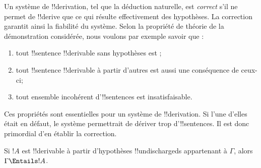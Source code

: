 \documentclass[../../../include/open-logic-section]{subfiles}
\begin{document}
      {}
      {}
      

\begin{explain}
Un système de !!{derivation}, tel que la déduction naturelle, est
\emph{correct} s'il ne permet de !!{derive} que ce qui résulte
effectivement des hypothèses. La correction garantit ainsi la
fiabilité du système. Selon la propriété de théorie de la
démonstration considérée, nous voulons par exemple savoir que :
\begin{enumerate}
\item tout !!{sentence} !!{derivable} sans hypothèses est
  ;
\item tout !!{sentence} !!{derivable} à partir d'autres est
  aussi une conséquence de ceux-ci;
\item tout ensemble incohérent d'!!{sentence}s est insatisfaisable.
\end{enumerate}
Ces propriétés sont essentielles pour un système de !!{derivation}.
Si l'une d'elles était en défaut, le système permettrait de dériver
trop d'!!{sentence}s. Il est donc primordial d'en établir la
correction.
\end{explain}

\begin{thm}[Correction]
Si $!A$ est !!{derivable} à partir d'hypothèses
!!{undischarged}s appartenant à $\Gamma$, alors $\Gamma \Entails !A$.
\end{thm}
\end{document}
